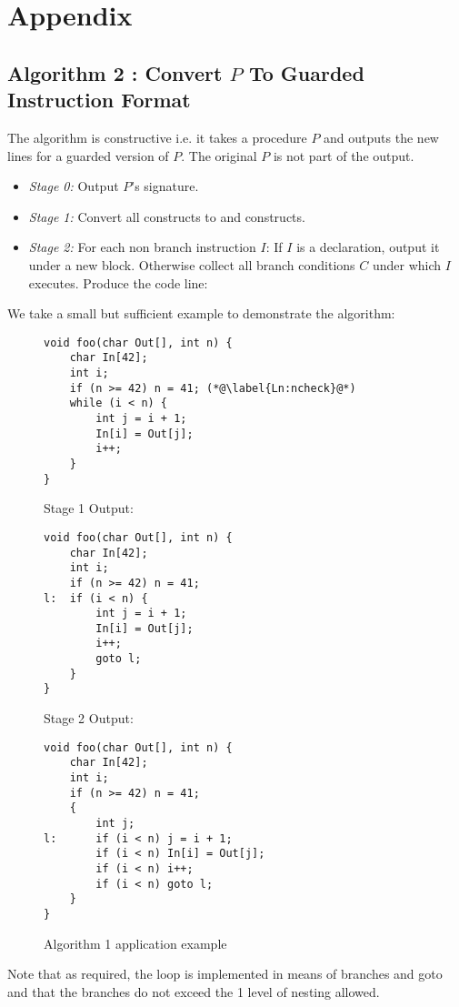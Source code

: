 \section{Appendix} \label{Se:Appendix}


\subsection{Algorithm 2 : Convert $P$ To Guarded Instruction Format} \label{Se:GuardedAlg}
The algorithm is constructive i.e. it takes a procedure $P$ and outputs the new lines for a guarded version of $P$. The original $P$ is not part of the output.
\begin{itemize}
\item \emph{Stage 0:} Output $P$'s signature.
\item \emph{Stage 1:} Convert all  constructs to  and  constructs.
\item \emph{Stage 2:} For each non branch instruction $I$:
\subitem If $I$ is a declaration, output it under a new block.
\subitem Otherwise collect all branch conditions $C$ under which $I$ executes. Produce the code line: 
\end{itemize}

We take a small but sufficient example to demonstrate the algorithm:
\begin{figure}[H]
\begin{lstlisting}
void foo(char Out[], int n) {
    char In[42];
    int i;
    if (n >= 42) n = 41; (*@\label{Ln:ncheck}@*)
    while (i < n) {
        int j = i + 1;
        In[i] = Out[j];
        i++;
    }
}
\end{lstlisting}
Stage 1 Output:
\begin{lstlisting}
void foo(char Out[], int n) {
    char In[42];
    int i;
    if (n >= 42) n = 41;
l:  if (i < n) {
        int j = i + 1;
        In[i] = Out[j];
        i++;
        goto l;
    }
}
\end{lstlisting}
Stage 2 Output:
\begin{lstlisting}
void foo(char Out[], int n) {
    char In[42];
    int i;
    if (n >= 42) n = 41;
    {
        int j;
l:      if (i < n) j = i + 1;
        if (i < n) In[i] = Out[j];
        if (i < n) i++;
        if (i < n) goto l;
    }
}
\end{lstlisting} \caption{Algorithm 1 application example}
\end{figure}

Note that as required, the loop is implemented in means of branches and goto and that the branches do not exceed the 1 level of nesting allowed.

